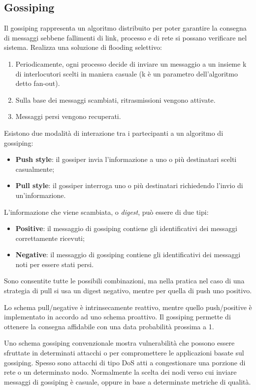 \subsection{Gossiping}
Il gossiping rappresenta un algoritmo distribuito per poter garantire la consegna di messaggi sebbene fallimenti di link, processo e di rete si possano verificare nel sistema. Realizza una soluzione di flooding selettivo:
\begin{enumerate}
    \item Periodicamente, ogni processo decide di inviare un messaggio a un insieme k di interlocutori scelti in maniera casuale (k è un parametro dell'algoritmo detto fan-out).
    \item Sulla base dei messaggi scambiati, ritrasmissioni vengono attivate.
    \item Messaggi persi vengono recuperati. 
\end{enumerate}
Esistono due modalità di interazione tra i partecipanti a un algoritmo di gossiping:
\begin{itemize}
    \item \textbf{Push style}: il gossiper invia l'informazione a uno o più destinatari scelti casualmente;
    \item \textbf{Pull style}: il gossiper interroga uno o più destinatari richiedendo l'invio di un'informazione.
\end{itemize}
L'informazione che viene scambiata, o \textit{digest}, può essere di due tipi:
\begin{itemize}
    \item \textbf{Positive}: il messaggio di gossiping contiene gli identificativi dei messaggi correttamente ricevuti;
    \item \textbf{Negative}: il messaggio di gossiping contiene gli identificativi dei messaggi noti per essere stati persi.
\end{itemize}
Sono consentite tutte le possibili combinazioni, ma nella pratica nel caso di una strategia di pull si usa un digest negativo, mentre per quella di push uno positivo.

Lo schema pull/negative è intrinsecamente reattivo, mentre quello push/positive è implementato in accordo ad uno schema proattivo. Il gossiping permette di ottenere la consegna affidabile con una data probabilità prossima a 1.

\vspace{5mm}

Uno schema gossiping convenzionale mostra vulnerabilità che possono essere sfruttate in determinati attacchi o per compromettere le applicazioni basate sul gossiping. Spesso sono attacchi di tipo DoS atti a congestionare una porzione di rete o un determinato nodo. Normalmente la scelta dei nodi verso cui inviare messaggi di gossiping è casuale, oppure in base a determinate metriche di qualità.

